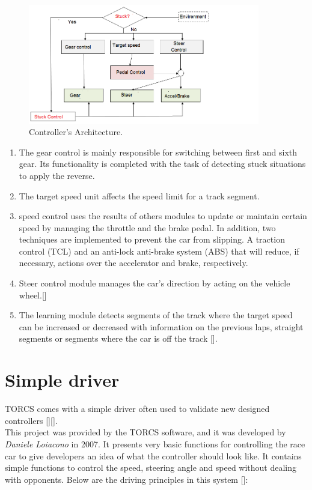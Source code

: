 \documentclass{llncs}
\begin{document}
\begin{figure}[h!]
	
	\centering
	\includegraphics[width=0.9\textwidth]{fig/archicontrole2.PNG}
	\begin{minipage}{10cm}
		\centering
		\caption{\footnotesize Controller's Architecture.}
		\label{archi}
	\end{minipage} 	
\end{figure}
\newpage


\begin{enumerate}
	
	
	\item The gear control is mainly responsible for switching between first and sixth gear. Its functionality is completed with the task of detecting stuck  situations to apply the reverse.
	
	\item The target speed unit affects the speed limit for a track segment.
	
	\item speed control uses the results of others modules  to update or maintain certain speed by managing the throttle and the brake pedal. In addition, two techniques are implemented to prevent the car from slipping. A traction control (TCL) and an anti-lock anti-brake system (ABS) that will reduce, if necessary, actions over the accelerator and brake, respectively.
	
	\item Steer control module  manages the car's direction by acting on the vehicle wheel.[\cite{fuzzy}]
	\item The learning module detects segments of the track where the target speed can be increased or decreased with information on the previous laps, straight segments or segments where the car is off the track [\cite{fuzzy2}].
\end{enumerate}
\section{Simple driver}	
TORCS  comes with a simple driver often used to validate new designed controllers	 [\cite{torcs}][\cite{torcs2}]. \\
This project was provided by the TORCS software, and it was developed by \textit{Daniele Loiacono}  in 2007. It presents very basic functions for controlling the race car to give developers an idea of what the controller should look like. It contains simple functions to control the speed, steering angle and speed without dealing with opponents. Below are the driving principles in this system [\cite{torcs}]:\\
\end{document}
